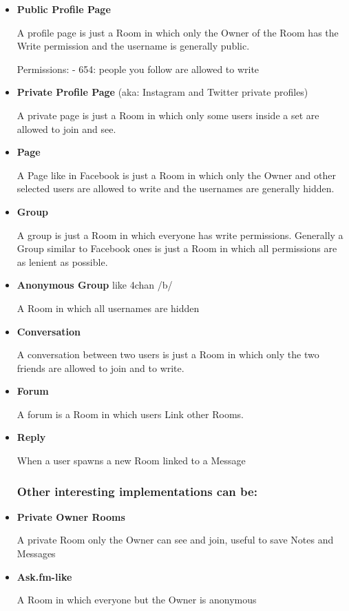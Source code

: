 \documentclass[12pt]{article}
\begin{document}
\begin{itemize}
    \item \textbf{Public Profile Page}
    
    A profile page is just a Room in which only the Owner of the Room has the Write permission and the username is generally public.

    Permissions: 
     - 654: people you follow are allowed to write


    \item \textbf{Private Profile Page} (aka: Instagram and Twitter private profiles)
    
    A private page is just a Room in which only some users inside a set are allowed to join and see.

    \item \textbf{Page}

    A Page like in Facebook is just a Room in which only the Owner and other selected users are allowed to write and the usernames are generally hidden.

    \item \textbf{Group}

    A group is just a Room in which everyone has write permissions.
    Generally a Group similar to Facebook ones is just a Room in which all permissions are as lenient as possible.

    \item \textbf{Anonymous Group} like 4chan /b/

    A Room in which all usernames are hidden

    \item \textbf{Conversation}

    A conversation between two users is just a Room in which only the two friends are allowed to join and to write.

    \item \textbf{Forum}

    A forum is a Room in which users Link other Rooms.

    \item \textbf{Reply}

    When a user spawns a new Room linked to a Message

    \subsubsection*{Other interesting implementations can be:}

    \item \textbf{Private Owner Rooms}
    
    A private Room only the Owner can see and join, useful to save Notes and Messages

    \item \textbf{Ask.fm-like}
    
    A Room in which everyone but the Owner is anonymous

    
    
    

\end{itemize}
\end{document}
